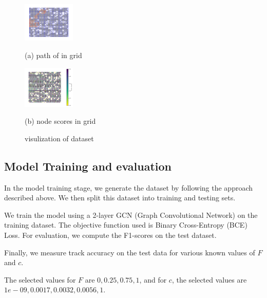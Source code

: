 \documentclass{article}
\begin{document}
\begin{figure}[htb]
  \begin{minipage}[b]{.48\linewidth}
    \centering
    \centerline{\includegraphics[width=2.5cm]{images/path}}
    \centerline{(a) path of in grid}\medskip
  \end{minipage}
  \hfill
  \begin{minipage}[b]{0.48\linewidth}
    \centering
    \centerline{\includegraphics[width=2.5cm]{images/scores}}
    \centerline{(b) node scores in grid }\medskip
  \end{minipage}
  \caption{visulization of dataset}
  \label{fig:data}
  \end{figure}

  \subsection{Model Training and evaluation}
  \label{ssec:model}

  In the model training stage, we generate the dataset by following the approach described above. We then split this dataset into training and testing sets.

  We train the model using a 2-layer GCN (Graph Convolutional Network) on the training dataset. The objective function used is Binary Cross-Entropy (BCE) Loss.
  For evaluation, we compute the F1-scores on the test dataset.

  Finally, we measure track accuracy on the test data for various known values of $F$ and $c$.

  The selected values for $F$ are $0, 0.25, 0.75, 1$, and for $c$, the selected values are $1e-09, 0.0017, 0.0032, 0.0056, 1$.
  
\end{document}
